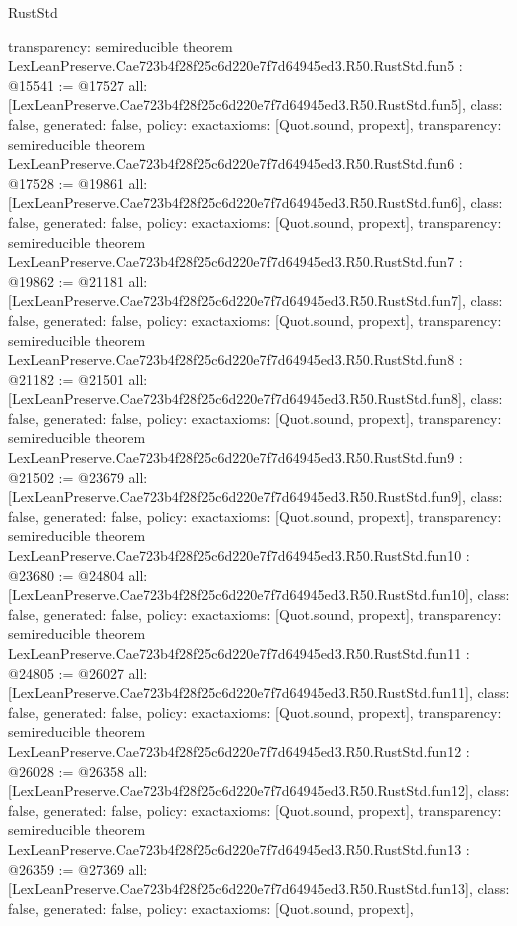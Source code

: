 \begin{lexlean}{RustStd}
\begin{coremodule}
{  transparency: semireducible
}
theorem LexLeanPreserve.Cae723b4f28f25c6d220e7f7d64945ed3.R50.RustStd.fun5 : @15541 := @17527 {
  all: [LexLeanPreserve.Cae723b4f28f25c6d220e7f7d64945ed3.R50.RustStd.fun5],
  class: false,
  generated: false,
  policy: exact{axioms: [Quot.sound, propext]},
  transparency: semireducible
}
theorem LexLeanPreserve.Cae723b4f28f25c6d220e7f7d64945ed3.R50.RustStd.fun6 : @17528 := @19861 {
  all: [LexLeanPreserve.Cae723b4f28f25c6d220e7f7d64945ed3.R50.RustStd.fun6],
  class: false,
  generated: false,
  policy: exact{axioms: [Quot.sound, propext]},
  transparency: semireducible
}
theorem LexLeanPreserve.Cae723b4f28f25c6d220e7f7d64945ed3.R50.RustStd.fun7 : @19862 := @21181 {
  all: [LexLeanPreserve.Cae723b4f28f25c6d220e7f7d64945ed3.R50.RustStd.fun7],
  class: false,
  generated: false,
  policy: exact{axioms: [Quot.sound, propext]},
  transparency: semireducible
}
theorem LexLeanPreserve.Cae723b4f28f25c6d220e7f7d64945ed3.R50.RustStd.fun8 : @21182 := @21501 {
  all: [LexLeanPreserve.Cae723b4f28f25c6d220e7f7d64945ed3.R50.RustStd.fun8],
  class: false,
  generated: false,
  policy: exact{axioms: [Quot.sound, propext]},
  transparency: semireducible
}
theorem LexLeanPreserve.Cae723b4f28f25c6d220e7f7d64945ed3.R50.RustStd.fun9 : @21502 := @23679 {
  all: [LexLeanPreserve.Cae723b4f28f25c6d220e7f7d64945ed3.R50.RustStd.fun9],
  class: false,
  generated: false,
  policy: exact{axioms: [Quot.sound, propext]},
  transparency: semireducible
}
theorem LexLeanPreserve.Cae723b4f28f25c6d220e7f7d64945ed3.R50.RustStd.fun10 : @23680 := @24804 {
  all: [LexLeanPreserve.Cae723b4f28f25c6d220e7f7d64945ed3.R50.RustStd.fun10],
  class: false,
  generated: false,
  policy: exact{axioms: [Quot.sound, propext]},
  transparency: semireducible
}
theorem LexLeanPreserve.Cae723b4f28f25c6d220e7f7d64945ed3.R50.RustStd.fun11 : @24805 := @26027 {
  all: [LexLeanPreserve.Cae723b4f28f25c6d220e7f7d64945ed3.R50.RustStd.fun11],
  class: false,
  generated: false,
  policy: exact{axioms: [Quot.sound, propext]},
  transparency: semireducible
}
theorem LexLeanPreserve.Cae723b4f28f25c6d220e7f7d64945ed3.R50.RustStd.fun12 : @26028 := @26358 {
  all: [LexLeanPreserve.Cae723b4f28f25c6d220e7f7d64945ed3.R50.RustStd.fun12],
  class: false,
  generated: false,
  policy: exact{axioms: [Quot.sound, propext]},
  transparency: semireducible
}
theorem LexLeanPreserve.Cae723b4f28f25c6d220e7f7d64945ed3.R50.RustStd.fun13 : @26359 := @27369 {
  all: [LexLeanPreserve.Cae723b4f28f25c6d220e7f7d64945ed3.R50.RustStd.fun13],
  class: false,
  generated: false,
  policy: exact{axioms: [Quot.sound, propext]},
}
\end{coremodule}
\end{lexlean}
